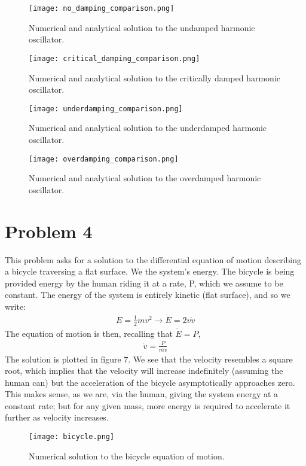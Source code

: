 \documentclass[letter,12pt]{article}
\begin{document}
\begin{figure}[htbp]
    \centering
    \texttt{[image: no\_damping\_comparison.png]}
    \caption{Numerical and analytical solution to the undamped harmonic oscillator.}
\end{figure}

\begin{figure}[htbp]
    \centering
    \texttt{[image: critical\_damping\_comparison.png]}
    \caption{Numerical and analytical solution to the critically damped harmonic oscillator.}
\end{figure}

\begin{figure}[htbp]
    \centering
    \texttt{[image: underdamping\_comparison.png]}
    \caption{Numerical and analytical solution to the underdamped harmonic oscillator.}
\end{figure}

\begin{figure}[htbp]
    \centering
    \texttt{[image: overdamping\_comparison.png]}
    \caption{Numerical and analytical solution to the overdamped harmonic oscillator.}
\end{figure}

\section{Problem 4}

This problem asks for a solution to the differential equation of motion describing a bicycle traversing a flat surface. We the system's energy. The bicycle is being provided energy by the human riding it at a rate, P, which we assume to be constant. The energy of the system is entirely kinetic (flat surface), and so we write:
\begin{align}
E = \frac{1}{2} m v^2 \to \dot{E} = 2v\dot{v}
\end{align}
The equation of motion is then, recalling that $\dot{E} = P$,
\begin{align}
\dot{v} = \frac{P}{mv}
\end{align}
The solution is plotted in figure $7$. We see that the velocity resembles a square root, which implies that the velocity will increase indefinitely (assuming the human can) but the acceleration of the bicycle asymptotically approaches zero. This makes sense, as we are, via the human, giving the system energy at a constant rate; but for any given mass, more energy is required to accelerate it further as velocity increases. 

\begin{figure}[htbp]
    \centering
    \texttt{[image: bicycle.png]}
    \caption{Numerical solution to the bicycle equation of motion.}
\end{figure}
\end{document}
